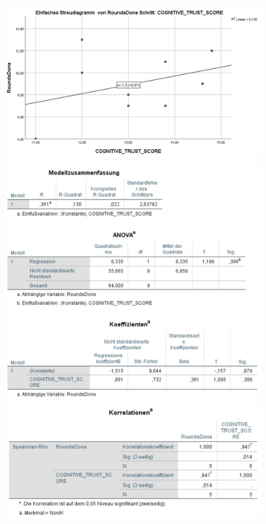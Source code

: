 \documentclass[a4paper,11pt]{article}%
\renewcommand{\\}{\vspace*{0.5\baselineskip} \newline}
\begin{document}
\begin{figure}[H]
\centering
		\begin{footnotesize}
			\includegraphics[scale=0.6]{Abbildungen/Post_QuestionnaireStatistiks/h3_both_diagramm_korr}
			\includegraphics[scale=0.6]{Abbildungen/Post_QuestionnaireStatistiks/h3_both_regression}
			\includegraphics[scale=0.6]{Abbildungen/Post_QuestionnaireStatistiks/H3_NIK_Korrelation_Spearman}

\end{footnotesize}
\end{figure}
\end{document}
